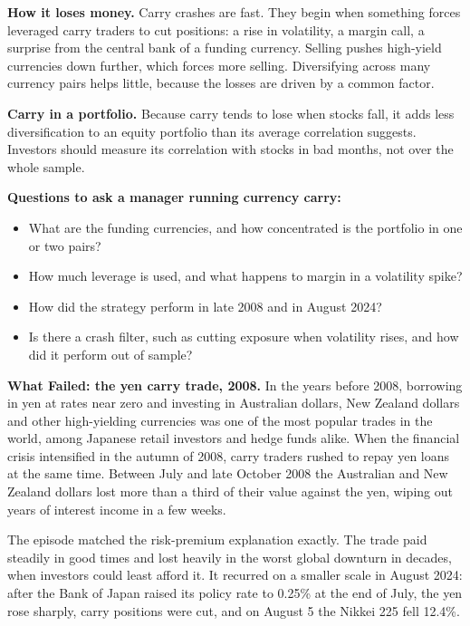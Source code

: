 \textbf{How it loses money.} Carry crashes are fast. They begin when something forces leveraged carry traders to cut positions: a rise in volatility, a margin call, a surprise from the central bank of a funding currency. Selling pushes high-yield currencies down further, which forces more selling. Diversifying across many currency pairs helps little, because the losses are driven by a common factor.

\textbf{Carry in a portfolio.} Because carry tends to lose when stocks fall, it adds less diversification to an equity portfolio than its average correlation suggests. Investors should measure its correlation with stocks in bad months, not over the whole sample.

\textbf{Questions to ask a manager running currency carry:}

\begin{itemize}
  \item What are the funding currencies, and how concentrated is the portfolio in one or two pairs?
  \item How much leverage is used, and what happens to margin in a volatility spike?
  \item How did the strategy perform in late 2008 and in August 2024?
  \item Is there a crash filter, such as cutting exposure when volatility rises, and how did it perform out of sample?
\end{itemize}

\begin{callout}
\textbf{What Failed: the yen carry trade, 2008.} In the years before 2008, borrowing in yen at rates near zero and investing in Australian dollars, New Zealand dollars and other high-yielding currencies was one of the most popular trades in the world, among Japanese retail investors and hedge funds alike. When the financial crisis intensified in the autumn of 2008, carry traders rushed to repay yen loans at the same time. Between July and late October 2008 the Australian and New Zealand dollars lost more than a third of their value against the yen, wiping out years of interest income in a few weeks.

The episode matched the risk-premium explanation exactly. The trade paid steadily in good times and lost heavily in the worst global downturn in decades, when investors could least afford it. It recurred on a smaller scale in August 2024: after the Bank of Japan raised its policy rate to 0.25\% at the end of July, the yen rose sharply, carry positions were cut, and on August 5 the Nikkei 225 fell 12.4\%.
\end{callout}

